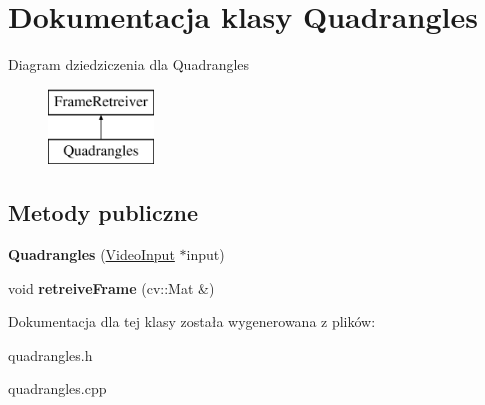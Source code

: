 \hypertarget{class_quadrangles}{
\section{Dokumentacja klasy Quadrangles}
\label{class_quadrangles}
}
Diagram dziedziczenia dla Quadrangles\begin{figure}[H]
\begin{center}
\leavevmode
\includegraphics[height=2cm]{class_quadrangles}
\end{center}
\end{figure}
\subsection*{Metody publiczne}
\begin{DoxyCompactItemize}
\item 
\hypertarget{class_quadrangles_af9b8b77e42de39798ffa082f0bf06df8}{
{\bfseries Quadrangles} (\hyperlink{class_video_input}{VideoInput} $\ast$input)}
\label{class_quadrangles_af9b8b77e42de39798ffa082f0bf06df8}

\item 
\hypertarget{class_quadrangles_adb48885a3de3b1ed8715eb25fcb98936}{
void {\bfseries retreiveFrame} (cv::Mat \&)}
\label{class_quadrangles_adb48885a3de3b1ed8715eb25fcb98936}

\end{DoxyCompactItemize}


Dokumentacja dla tej klasy została wygenerowana z plików:\begin{DoxyCompactItemize}
\item 
quadrangles.h\item 
quadrangles.cpp\end{DoxyCompactItemize}
